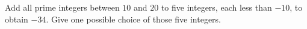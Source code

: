 Add all prime integers between $10$ and $20$ to five integers, each less than $-10$, to obtain $-34$. Give one possible choice of those five integers.
